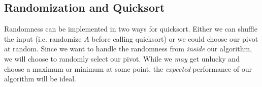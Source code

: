 \documentclass[titlepage, 12pt, leqno]{article}
\begin{document}
\subsection{Randomization and Quicksort}
Randomness can be implemented in two ways for quicksort. Either we can shuffle
the input (i.e. randomize $A$ before calling quicksort) or we could choose our
pivot at random. Since we want to handle the randomness from \textit{inside}
our algorithm, we will choose to randomly select our pivot. While we 
\textit{may} get unlucky and choose a maximum or minimum at some point, the
\textit{expected} performance of our algorithm will be ideal.
\end{document}
